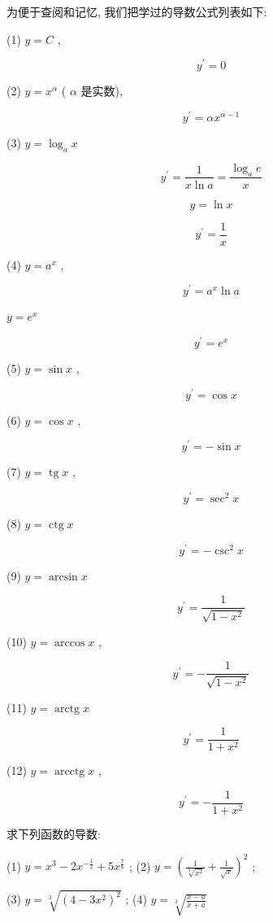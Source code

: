 \documentclass[lang=cn,newtx,12pt,scheme=chinese]{elegantbook}
\begin{document}
为便于查阅和记忆, 我们把学过的导数公式列表如下:

(1) \(y = C\) ,

\[
{y}^{\prime } = 0
\]

(2) \(y = {x}^{\alpha }\) ( \(\alpha\) 是实数),

\[
{y}^{\prime } = \alpha {x}^{\alpha - 1}
\]

(3) \(y = {\log }_{a}x\)

\[
{y}^{\prime } = \frac{1}{x\ln a} = \frac{{\log }_{a}e}{x}
\]

\[
y = \ln x
\]

\[
{y}^{\prime } = \frac{1}{x}
\]

(4) \(y = {a}^{x}\) ,

\[
{y}^{\prime } = {a}^{x}\ln a
\]

\(y = {e}^{x}\)

\[
{y}^{\prime } = {e}^{x}
\]

(5) \(y = \sin x\) ,

\[
{y}^{\prime } = \cos x
\]

(6) \(y = \cos x\) ,

\[
{y}^{\prime } = - \sin x
\]

(7) \(y = \operatorname{tg}x\) ,

\[
{y}^{\prime } = {\sec }^{2}x
\]

(8) \(y = \operatorname{ctg}x\)

\[
{y}^{\prime } = - {\csc }^{2}x
\]

(9) \(y = \arcsin x\)

\[
{y}^{\prime } = \frac{1}{\sqrt{1 - {x}^{2}}}
\]

(10) \(y = \arccos x\) ,

\[
{y}^{\prime } = - \frac{1}{\sqrt{1 - {x}^{2}}}
\]

(11) \(y = \operatorname{arctg}x\)

\[
{y}^{\prime } = \frac{1}{1 + {x}^{2}}
\]

(12) \(y = \operatorname{arcctg}x\) ,

\[
{y}^{\prime } = - \frac{1}{1 + {x}^{2}}
\]

\begin{problemset}[练习]

\item 求下列函数的导数:

(1) \(y = {x}^{3} - 2{x}^{-\frac{1}{2}} + 5{x}^{\frac{7}{6}}\) ; (2) \(y = {\left( \frac{1}{\sqrt[3]{{x}^{2}}} + \frac{1}{\sqrt{x}}\right) }^{2}\) ;

(3) \(y = \sqrt[3]{{\left( 4 - 3{x}^{2}\right) }^{2}}\) ; (4) \(y = \sqrt[3]{\frac{x - a}{x + a}}\)

\end{problemset}
\end{document}

